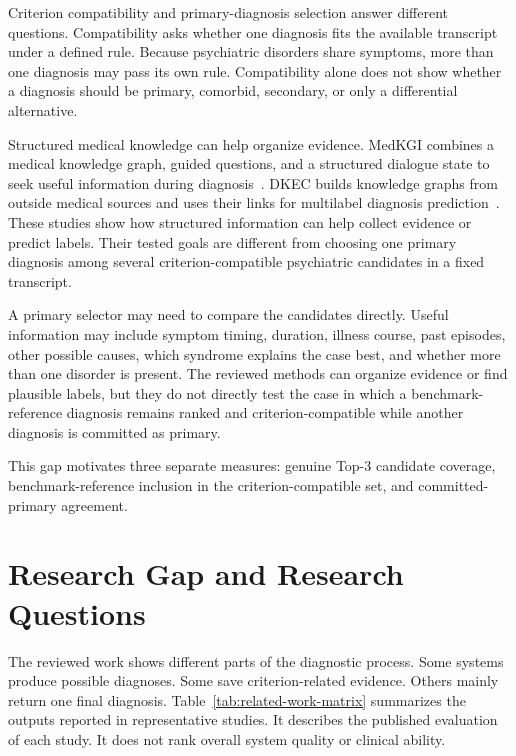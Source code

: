 Criterion compatibility and primary-diagnosis selection answer different questions. Compatibility asks whether one diagnosis fits the available transcript under a defined rule. Because psychiatric disorders share symptoms, more than one diagnosis may pass its own rule. Compatibility alone does not show whether a diagnosis should be primary, comorbid, secondary, or only a differential alternative.

Structured medical knowledge can help organize evidence. MedKGI combines a medical knowledge graph, guided questions, and a structured dialogue state to seek useful information during diagnosis~\citep{wang2025medkgi}. DKEC builds knowledge graphs from outside medical sources and uses their links for multilabel diagnosis prediction~\citep{ge2024dkec}. These studies show how structured information can help collect evidence or predict labels. Their tested goals are different from choosing one primary diagnosis among several criterion-compatible psychiatric candidates in a fixed transcript.

A primary selector may need to compare the candidates directly. Useful information may include symptom timing, duration, illness course, past episodes, other possible causes, which syndrome explains the case best, and whether more than one disorder is present. The reviewed methods can organize evidence or find plausible labels, but they do not directly test the case in which a benchmark-reference diagnosis remains ranked and criterion-compatible while another diagnosis is committed as primary.

This gap motivates three separate measures: genuine Top-3 candidate coverage, benchmark-reference inclusion in the criterion-compatible set, and committed-primary agreement.

\section{Research Gap and Research Questions}

The reviewed work shows different parts of the diagnostic process. Some systems produce possible diagnoses. Some save criterion-related evidence. Others mainly return one final diagnosis. Table~\ref{tab:related-work-matrix} summarizes the outputs reported in representative studies. It describes the published evaluation of each study. It does not rank overall system quality or clinical ability.

